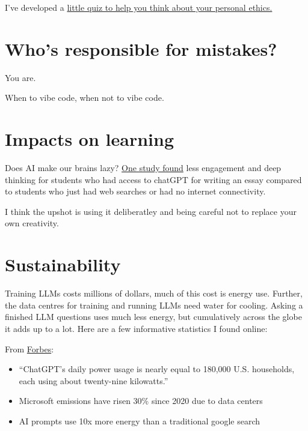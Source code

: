 \documentclass[
  letterpaper,
  DIV=11,
  numbers=noendperiod]{scrreprt}
\providecommand{\tightlist}{%
  \setlength{\itemsep}{0pt}\setlength{\parskip}{0pt}}\usepackage{longtable,booktabs,array}
\begin{document}
I've developed a
\href{https://docs.google.com/forms/d/e/1FAIpQLSeK7KInwDKSgCEKYSj5xFVeT4gGIxr4cCDCRqYl29i6n_-eOA/viewform}{little
quiz to help you think about your personal ethics.}

\section{Who's responsible for
mistakes?}\label{whos-responsible-for-mistakes}

You are.

When to vibe code, when not to vibe code.

\section{Impacts on learning}\label{impacts-on-learning}

Does AI make our brains lazy?
\href{https://www.nature.com/articles/d41586-025-02005-y}{One study
found} less engagement and deep thinking for students who had access to
chatGPT for writing an essay compared to students who just had web
searches or had no internet connectivity.

I think the upshot is using it deliberatley and being careful not to
replace your own creativity.

\section{Sustainability}\label{sustainability}

Training LLMs costs millions of dollars, much of this cost is energy
use. Further, the data centres for training and running LLMs need water
for cooling. Asking a finished LLM questions uses much less energy, but
cumulatively across the globe it adds up to a lot. Here are a few
informative statistics I found online:

From
\href{https://www.forbes.com/sites/cindygordon/2024/03/12/chatgpt-and-generative-ai-innovations-are-creating-sustainability-havoc/}{Forbes}:

\begin{itemize}
\tightlist
\item
  ``ChatGPT's daily power usage is nearly equal to 180,000 U.S.
  households, each using about twenty-nine kilowatts.''
\item
  Microsoft emissions have risen 30\% since 2020 due to data centers
\item
  AI prompts use 10x more energy than a traditional google search
\end{itemize}
\end{document}
